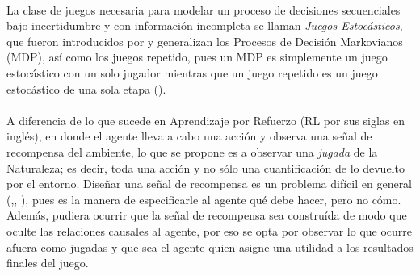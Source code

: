 \documentclass[11pt]{article}
\theoremstyle{plain}
\begin{document}
\\
La clase de juegos necesaria para modelar un proceso de decisiones secuenciales bajo incertidumbre y con información incompleta se llaman \textit{Juegos Estocásticos}, que fueron introducidos por \cite{shapley1953stochastic} y generalizan los Procesos de Decisión Markovianos (MDP), así como los juegos repetido, pues un MDP es simplemente un juego estocástico con un solo jugador mientras que un juego repetido es un juego estocástico de una sola etapa (\cite{shoham2008multiagent}).\\
\\
A diferencia de lo que sucede en Aprendizaje por Refuerzo (RL por sus siglas en inglés), en donde el agente lleva a cabo una acción y observa una señal de recompensa del ambiente, lo que se propone es a observar una \textit{jugada} de la Naturaleza; es decir, toda una acción y no sólo una cuantificación de lo devuelto por el entorno. Diseñar una señal de recompensa es un problema difícil en general (\cite{sutton1998reinforcement},\cite{dewey2014reinforcement}, \cite{DRLnotwork}), pues es la manera de especificarle al agente qué debe hacer, pero no cómo. Además, pudiera ocurrir que la señal de recompensa sea construída de modo que oculte las relaciones causales al agente, por eso se opta por observar lo que ocurre afuera como jugadas y que sea el agente quien asigne una utilidad a los resultados finales del juego.
\end{document}

